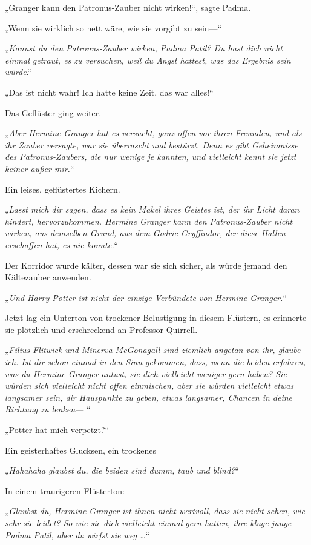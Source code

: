 {„Granger kann den Patronus-Zauber nicht wirken!“, sagte Padma.

„Wenn sie wirklich so nett wäre, wie sie vorgibt zu sein—“

„\emph{Kannst du den Patronus-Zauber wirken, Padma Patil? Du hast dich nicht einmal getraut, es zu versuchen, weil du Angst hattest, was das Ergebnis sein würde}.“

„Das ist nicht wahr! Ich hatte keine Zeit, das war alles!“

Das Geflüster ging weiter.

„\emph{Aber Hermine Granger hat es versucht, ganz offen vor ihren Freunden, und als ihr Zauber versagte, war sie überrascht und bestürzt. Denn es gibt Geheimnisse des Patronus-Zaubers, die nur wenige je kannten, und vielleicht kennt sie jetzt keiner außer mir.}“

Ein leises, geflüstertes Kichern.

„\emph{Lasst mich dir sagen, dass es kein Makel ihres Geistes ist, der ihr Licht daran hindert, hervorzukommen. Hermine Granger kann den Patronus-Zauber nicht wirken, aus demselben Grund, aus dem Godric Gryffindor, der diese Hallen erschaffen hat, es nie konnte.}“

Der Korridor wurde kälter, dessen war sie sich sicher, als würde jemand den Kältezauber anwenden.

„\emph{Und Harry Potter ist nicht der einzige Verbündete von Hermine Granger.}“

Jetzt lag ein Unterton von trockener Belustigung in diesem Flüstern, es erinnerte sie plötzlich und erschreckend an Professor Quirrell.

„\emph{Filius Flitwick und Minerva McGonagall sind ziemlich angetan von ihr, glaube ich. Ist dir schon einmal in den Sinn gekommen, dass, wenn die beiden erfahren, was du Hermine Granger antust, sie dich vielleicht weniger gern haben? Sie würden sich vielleicht nicht offen einmischen, aber sie würden vielleicht etwas langsamer sein, dir Hauspunkte zu geben, etwas langsamer, Chancen in deine Richtung zu lenken—} “

„Potter hat mich verpetzt?“

Ein geisterhaftes Glucksen, ein trockenes

„\emph{Hahahaha glaubst du, die beiden sind dumm, taub und blind?}“

In einem traurigeren Flüsterton:

„\emph{Glaubst du, Hermine Granger ist ihnen nicht wertvoll, dass sie nicht sehen, wie sehr sie leidet? So wie sie dich vielleicht einmal gern hatten, ihre kluge junge Padma Patil, aber du wirfst sie weg …}“

}
